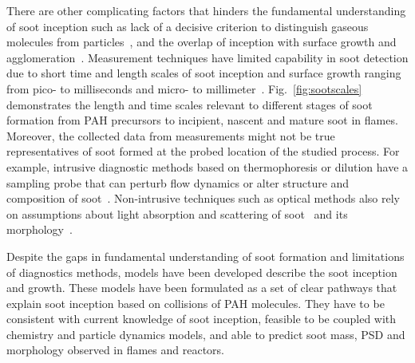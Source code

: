 There are other complicating factors that hinders the fundamental understanding of soot inception such as lack of a decisive criterion to distinguish gaseous molecules from particles~\citep{d2009combustion}, and the overlap of inception with surface growth and agglomeration~\cite{martin2022soot}. Measurement techniques have limited capability in soot detection due to short time and length scales of soot inception and surface growth ranging from pico- to milliseconds and micro- to millimeter~\citep{violi2005relative}. Fig.~\ref{fig:sootscales} demonstrates the length and time scales relevant to different stages of soot formation from PAH precursors to incipient, nascent and mature soot in flames. Moreover, the collected data from measurements might not be true representatives of soot formed at the probed location of the studied process. For example, intrusive diagnostic methods based on thermophoresis or dilution have a sampling probe that can perturb flow dynamics or alter structure and composition of soot~\cite{kholghy2017comparison}. Non-intrusive techniques such as optical methods also rely on assumptions about light absorption and scattering of soot~\citep{shaddix1996laser} and its morphology~\citep{doner2017impact}.


Despite the gaps in fundamental understanding of soot formation and limitations of diagnostics methods, models have been developed describe the soot inception and growth. These models have been formulated as a set of clear pathways that explain soot inception based on collisions of PAH molecules. They have to be consistent with current knowledge of soot inception, feasible to be coupled with chemistry and particle dynamics models, and able to predict soot mass, PSD and morphology observed in flames and reactors.

